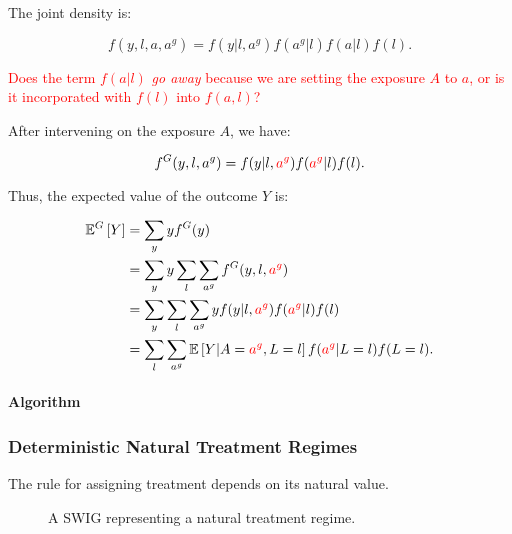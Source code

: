 \documentclass[12pt]{article}
\begin{document}
The joint density is:

\begin{equation}
    f(y,l,a,a^g) = f(y|l,a^g) f(a^g|l) f(a|l) f(l).
\end{equation}

\textcolor{red}{Does the term $f(a|l)$ \textit{go away} because we are setting the exposure $A$ to $a$, or is it incorporated with $f(l)$ into $f(a,l)$?}

After intervening on the exposure $A$, we have:

\begin{equation}
    f^G(y,l,a^g) = f(y|l,\textcolor{red}{a^g}) f(\textcolor{red}{a^g}|l) f(l).
\end{equation}

Thus, the expected value of the outcome $Y$ is:

\begin{align}
    \mathbb{E}^G \left[ Y \right] &= \sum_y y f^G(y) \\
    &= \sum_y y \sum_l \sum_{a^g} f^G(y,l,\textcolor{red}{a^g}) \\
    &= \sum_y \sum_l \sum_{a^g} y f(y|l,\textcolor{red}{a^g}) f(\textcolor{red}{a^g}|l) f(l) \\
    &= \sum_l \sum_{a^g} \mathbb{E} \left[ Y|A=\textcolor{red}{a^g},L=l\right] f(\textcolor{red}{a^g}|L=l) f(L=l).
\end{align}

\paragraph{Algorithm}

\subsubsection*{Deterministic Natural Treatment Regimes}
The rule for assigning treatment depends on its natural value.

\begin{figure}[h]
\centering
{}
\caption{A SWIG representing a natural treatment regime.}
\label{fig:swig_det_nat_inv}
\end{figure}
\end{document}
